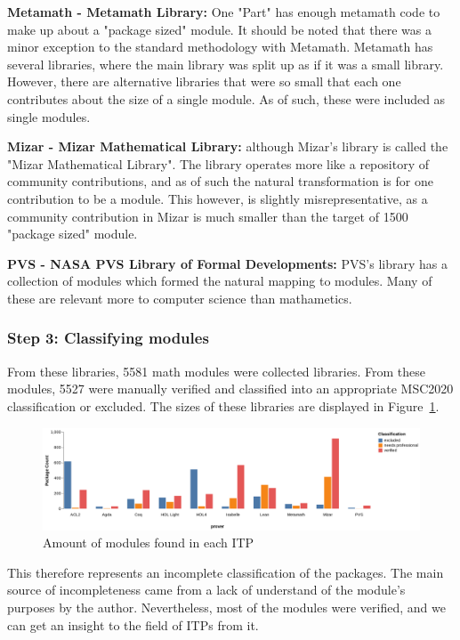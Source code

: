 \documentclass[
]{article}
\begin{document}
\textbf{Metamath - Metamath Library:} One "Part" has enough metamath
code to make up about a "package sized" module. It should be noted that
there was a minor exception to the standard methodology with Metamath.
Metamath has several libraries, where the main library was split up as
if it was a small library. However, there are alternative libraries that
were so small that each one contributes about the size of a single
module. As of such, these were included as single modules.

\textbf{Mizar - Mizar Mathematical Library:} although Mizar's library is
called the "Mizar Mathematical Library". The library operates more like
a repository of community contributions, and as of such the natural
transformation is for one contribution to be a module. This however, is
slightly misrepresentative, as a community contribution in Mizar is much
smaller than the target of 1500 "package sized" module.

\textbf{PVS - NASA PVS Library of Formal Developments:} PVS's library
has a collection of modules which formed the natural mapping to modules.
Many of these are relevant more to computer science than mathametics.

\hypertarget{step-3-classifying-modules}{%
\subsubsection{Step 3: Classifying
modules}\label{step-3-classifying-modules}}

From these libraries, 5581 math modules were collected libraries. From
these modules, 5527 were manually verified and classified into an
appropriate MSC2020 classification or excluded. The sizes of these
libraries are displayed in Figure~\ref{fig:total_itp_modules}.

\begin{figure}
    \centering
    \includegraphics{./Images/ITPTotal.png}
    \caption{Amount of modules found in each ITP}
    \label{fig:total_itp_modules}
\end{figure}

This therefore represents an incomplete classification of the packages.
The main source of incompleteness came from a lack of understand of the
module's purposes by the author. Nevertheless, most of the modules were
verified, and we can get an insight to the field of ITPs from it.
\end{document}
